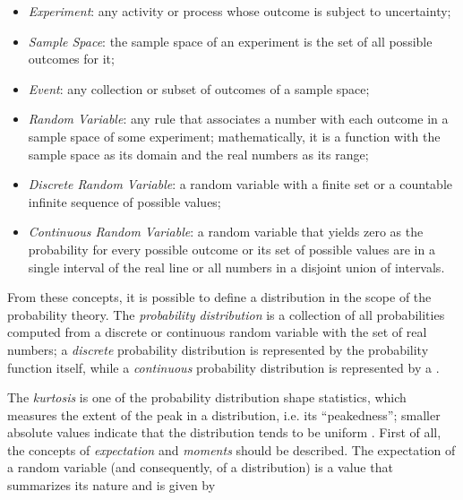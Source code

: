 \begin{itemize}
    \item \emph{Experiment}: any activity or process whose outcome is subject to uncertainty;
    
    \item \emph{Sample Space}: the sample space of an experiment is the set of all possible outcomes for it;
    
    \item \emph{Event}: any collection or subset of outcomes of a sample space;
    
    \item \emph{Random Variable}: any rule that associates a number with each outcome in a sample space of some experiment; mathematically, it is a function with the sample space as its domain and the real numbers as its range;
    
    \item \emph{Discrete Random Variable}: a random variable with a finite set or a countable infinite sequence of possible values;
    
    \item \emph{Continuous Random Variable}: a random variable that yields zero as the probability for every possible outcome or its set of possible values are in a single interval of the real line or all numbers in a disjoint union of intervals.
    
\end{itemize}

From these concepts, it is possible to define a distribution in the scope of the probability theory. The \emph{probability distribution} is a collection of all probabilities computed from a  discrete or continuous random variable with the set of real numbers; a \emph{discrete} probability distribution is represented by the probability function itself, while a \emph{continuous} probability distribution is represented by a  \cite{mendenhall2016statistics}.


The \emph{kurtosis} is one of the probability distribution shape statistics, which measures the extent of the peak in a distribution, i.e. its ``peakedness''; smaller absolute values indicate that the distribution tends to be uniform \cite{zwillinger1999crc}. First of all, the concepts of \emph{expectation} and \emph{moments} should be described. The expectation of a random variable (and consequently, of a distribution) is a value that summarizes its nature and is given by

